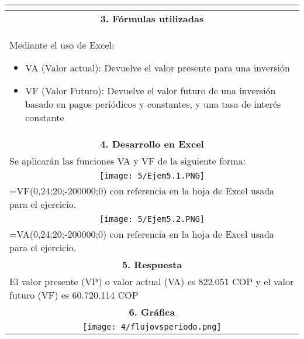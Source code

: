 \begin{center}
\begin{longtable}[H]{|p{0.333\linewidth}|p{0.3333\linewidth}|p{0.3333\linewidth}|}
{\begin{center}
  \end{center}
  }                                                                                                   \\ \hline
  \multicolumn{3}{|c|}{\cellcolor[HTML]{FFB183}\textbf{3. Fórmulas utilizadas}}                       \\ \hline
  \multicolumn{3}{|p{\columnwidth}|}{Mediante el uso de Excel:
  \begin{itemize}
   \item VA (Valor actual): Devuelve el valor presente para una inversión
   \item VF (Valor Futuro): Devuelve el valor futuro de una inversión basado en pagos
         periódicos y constantes, y una tasa de interés constante
  \end{itemize}
  }                                                                                                   \\ \hline
  \multicolumn{3}{|c|}{\cellcolor[HTML]{FFB183}\textbf{4. Desarrollo en Excel}}                       \\ \hline
  \multicolumn{3}{|l|}{Se aplicarán las funciones VA y VF de la siguiente forma:}                     \\
  \multicolumn{3}{|c|}{ \texttt{[image: 5/Ejem5.1.PNG]}}        \\
  \multicolumn{3}{|l|}{=VF(0,24;20;-200000;0) con referencia en la hoja de Excel usada para el ejercicio.}    \\
  \multicolumn{3}{|c|}{ \texttt{[image: 5/Ejem5.2.PNG]}}        \\
  \multicolumn{3}{|l|}{=VA(0,24;20;-200000;0) con referencia en la hoja de Excel usada para el ejercicio.} \\ \hline
  \multicolumn{3}{|c|}{\cellcolor[HTML]{FFB183}\textbf{5. Respuesta}}                                 \\ \hline
  \multicolumn{3}{|p{\columnwidth}|}{
  El valor presente (VP) o valor actual (VA) es 822.051 COP y el valor futuro (VF) es 60.720.114 COP 
  }                                                                                                   \\ \hline
  \multicolumn{3}{|c|}{\cellcolor[HTML]{FFB183}\textbf{6. Gráfica}}                                   \\ \hline
  \multicolumn{3}{|c|}{\texttt{[image: 4/flujovsperiodo.png]}}      \\ \hline
 \end{longtable}
\end{center}
